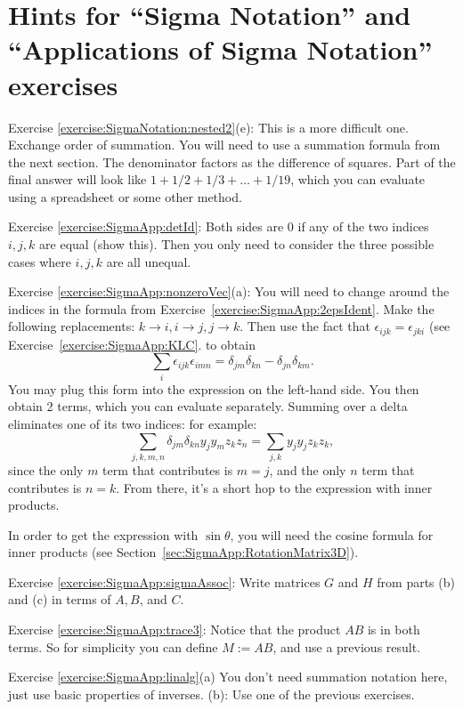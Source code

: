 \section{Hints for ``Sigma Notation'' and ``Applications of Sigma Notation''  exercises}
\label{sec:SigmaNotation:Hints} 

\noindent Exercise \ref{exercise:SigmaNotation:nested2}(e): This is a more difficult one.  Exchange order of summation. You will need to use a summation formula from the next section.  The denominator factors as the difference of squares.  Part of the final answer will look like $1 + 1/2 + 1/3 + \ldots + 1/19$, which you can evaluate using a spreadsheet or some other method. 

\noindent Exercise \ref{exercise:SigmaApp:detId}: Both sides are 0 if any of the two indices $i,j,k$ are equal (show this). Then you only need to consider the three possible cases where $i,j,k$ are all unequal.

\noindent Exercise \ref{exercise:SigmaApp:nonzeroVec}(a): You will need to change around the indices in the formula from Exercise~\ref{exercise:SigmaApp:2epsIdent}. Make the following replacements: $k \rightarrow i, i \rightarrow j, j \rightarrow k$.  Then use the fact that $\epsilon_{ijk}= \epsilon_{jki}$ (see Exercise~\ref{exercise:SigmaApp:KLC}.  to obtain
\[\sum_i \epsilon_{ijk} \epsilon_{imn} = \delta_{jm} \delta_{kn} - \delta_{jn} \delta_{km}. \]
You may plug this form into the expression on the left-hand side. You then obtain 2 terms, which you can evaluate separately. Summing over a delta  eliminates one of its two indices: for example:
\[ \sum_{j,k,m,n} \delta_{jm} \delta_{kn}  y_j y_m z_k z_n  = \sum_{j,k} y_j y_j z_k z_k, \]
since the only $m$ term that contributes is $m=j$, and the only $n$ term that contributes is $n=k$. From there, it's a short hop to the expression with inner products.

In order to get the expression with $\sin \theta$, you will need the cosine formula for inner products (see Section~\ref{sec:SigmaApp:RotationMatrix3D}).

\noindent Exercise \ref{exercise:SigmaApp:sigmaAssoc}: Write matrices $G$ and $H$ from parts (b) and (c) in terms of $A,B$, and $C$.

\noindent Exercise \ref{exercise:SigmaApp:trace3}: Notice that the product ${AB}$ is in both terms. So for simplicity you can define $M := AB$, and use a previous result.

\noindent Exercise \ref{exercise:SigmaApp:linalg}(a) You don't need summation notation here, just use basic properties of inverses. (b): Use one of the previous exercises.

